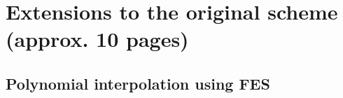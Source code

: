 \section{Extensions to the original scheme (approx. 10 pages)}

\subsection{Polynomial interpolation using FES}

\newpage
